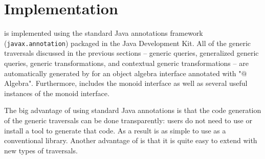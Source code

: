\section{\name Implementation}

\name is implemented using the standard Java annotations framework
(\lstinline{javax.annotation}) packaged in the Java Development Kit.
All of the generic traversals discussed in the previous sections --
generic queries, generalized generic queries, generic transformations,
and contextual generic transformations -- are automatically generated
by \name for an object algebra interface annotated with "$@$Algebra".
Furthermore, \name includes the monoid interface as well as several
useful instances of the monoid interface.

The big advantage of using standard Java annotations is that the code 
generation of the generic traversals can be done transparently: users 
do not need to use or install a tool to generate that code. As a
result \name is as simple to use as a conventional library. 
Another advantage of \name is that it is quite easy to extend with new 
types of traversals. 


\begin{comment}
To address this problem, we provide a framework \name, which utilizes \emph{Java Annotation} to generate query and transformation interfaces based on the \emph{Object Algebra Interface}. For the below code: 
\begin{lstlisting}[numbers=none] 
@Algebra
public interface ExpAlg<Exp> {
	Exp Var(String s);
	Exp Lit(int i);
	Exp Add(Exp e1, Exp e2);
}
\end{lstlisting}
with the annotation "$@$Algebra", the framework will generate the boilerplate codes for us automatically. As for our ExpAlg example, the following directory structure will be generated by the library.

\dirtree{%
 .1 src/.
 .2 query/.
 .3 ExpAlgQuery.
 .3 G\_ExpAlgQuery.
 .2 transform/.
 .3 ExpAlgTransform.
 .3 G\_ExpAlgTransform.
}

Here the automatically generated ExpAlgQuery, G\_ExpAlgQuery, ExpAlgTransform and G\_ExpAlgTransform are exactly the same code as we discussed in the previous sections. Developers can implement interesting methods by inheriting from these generic classes without worrying about the traversing work.


With our framework \name, when programming with query and
transformations, the programmer can skip the intermediate steps such
as constructing generic queries and transformations, but only focus on
rewriting the interesting cases. For instance, in our ExpAlg example,
to implement FreeVars algebra, we can simply override the
\lstinline{Exp Var(String s)} method of \lstinline{class ExpAlgQuery}
to return variable name, and provide the specific monoid needed, which
in this case will be a \lstinline{StringListMonoid}. While the
SubstVars algebra can be realized by overriding the \lstinline{Exp
  Var(String s)} method of ExpAlgTransform interface, which
substitutes variable names as specified. 
\end{comment}
